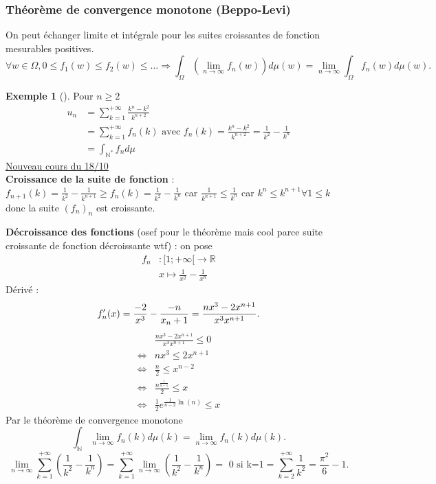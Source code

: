 \documentclass{article}
\theoremstyle{plain}%
\theoremstyle{definition}
\newtheorem{exmp}{Exemple}[section]
\theoremstyle{remark}
\begin{document}
    \subsubsection{Théorème de convergence monotone (Beppo-Levi)}
    On peut échanger limite et intégrale pour les suites croissantes de fonction mesurables positives. \\
    \[
        \forall w \in \Omega, 0 \leq f_1(w) \leq f_2(w) \leq \dots \Rightarrow \int_{\Omega }^{}(\lim_{n \to \infty} f_n(w))d \mu (w) = \lim_{n \to \infty} \int_{\Omega }^{}f_n(w) d \mu (w)
    .\]
    \begin{exmp}[]
        Pour $ n \geq 2 $ \begin{align*}
            u_n &= \sum_{k=1}^{+\infty } \frac{k^n - k^2}{k^{n+2}} \\
            &= \sum_{k=1}^{+\infty }f_n(k) \text{ avec } f_n(k) = \frac{k^n - k^2}{k^{n+2}} = \frac{1}{k^2}-\frac{1}{k^n} \\ 
            &= \int_{\mathbb{N}^*}^{} f_n d \mu 
        \end{align*}
\underline{Nouveau cours du 18/10} \\

        \textbf{Croissance de la suite de fonction} : $ f _{n+1} (k) = \frac{1}{k^2} - \frac{1}{k^{n+1}} \geq f_n(k) = \frac{1}{k^2} - \frac{1}{k^n}$ car $ \frac{1}{k^{n+1}} \leq \frac{1}{k^n} $  car $ k^n \leq k^{n+1} \forall 1 \leq k $ donc la suite $ (f_n)_n $ est croissante.

        \textbf{Décroissance des fonctions} (osef pour le théorème mais cool parce suite croissante de fonction décroissante wtf) : on pose \begin{align*}
            f_n &: [1; +\infty [ \to \mathbb{R} \\
                & x \mapsto \frac{1}{x^2}-\frac{1}{x^n}
        \end{align*}
        Dérivé : 
        \[
            f_n^\prime (x) = \frac{-2}{x^3}- \frac{-n}{x_n+1} = \frac{nx^3 - 2x^{n+1}}{x^3 x^{n+1}}  \\
        .\]
        \begin{align*}
            & \frac{nx^3 - 2x^{n+1}}{x^3 x^{n+1}} \leq 0 \\
            \Leftrightarrow & nx^3 \leq 2x^{n+1} \\
            \Leftrightarrow & \frac{n}{2}\leq x^{n-2} \\
            \Leftrightarrow & \frac{n^{\frac{1}{n-1}}}{2} \leq x \\
            \Leftrightarrow & \frac{1}{2} e^{\frac{1}{n-2}\ln (n)} \leq x
        \end{align*}
        Par le théorème de convergence monotone 
        \[
            \int_{\mathbb{N}} \lim_{n \to \infty} f_n(k) d \mu (k) = \lim_{n \to \infty} f_n(k)d \mu (k)
        .\]
        \[
            \lim_{n \to \infty} \sum_{k=1}^{+\infty } (\frac{1}{k^2} - \frac{1}{k^n}) = \sum_{k=1}^{+\infty}\lim_{n \to \infty} (\frac{1}{k^2} - \frac{1}{k^n}) = \text{ 0 si k=1} = \sum_{k=2}^{+\infty } \frac{1}{k^2} = \frac{\pi ^2}{6} - 1
        .\]
    \end{exmp}
\end{document}
